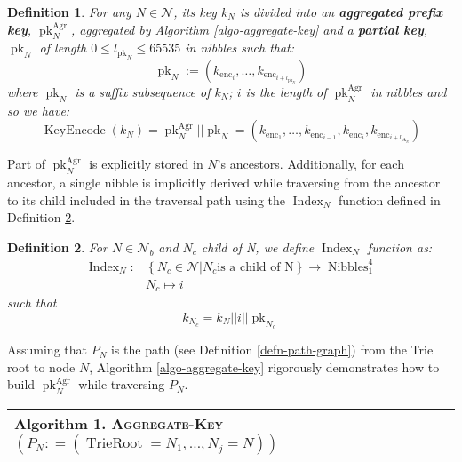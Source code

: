 \documentclass{article}
\newcommand{\assign}{:=}
\newcommand{\tmname}[1]{\textsc{#1}}
\newcommand{\tmop}[1]{\ensuremath{\operatorname{#1}}}
\newcommand{\tmstrong}[1]{\textbf{#1}}
\newcommand{\tmtextbf}[1]{{\bfseries{#1}}}
\newcommand{\tmtextsc}[1]{{\scshape{#1}}}
\newcounter{tmcounter}
\newcommand{\custombinding}[1]{%
  \setcounter{tmcounter}{#1}%
  \addtocounter{tmcounter}{-1}%
  \refstepcounter{tmcounter}}
\newtheorem{definition}{Definition}
\providecommand{\tmname}[1]{\tmtextsc{#1}}
\providecommand{\tmop}[1]{\ensuremath{\mathrm{#1}}}
\providecommand{\tmstrong}[1]{\tmtextbf{#1}}
\providecommand{\tmtextbf}[1]{\tmtextbf{#1}}
\newtheorem{definition}{Definition}
\begin{document}
\begin{definition}
  \label{defn-node-key}For any $N \in \mathcal{N}$, its key $k_N$ is divided
  into an {\tmstrong{aggregated prefix key}},
  {\tmstrong{$\tmop{pk}_N^{\tmop{Agr}}$}}, aggregated by Algorithm
  \ref{algo-aggregate-key} and a {\tmstrong{partial key}},
  {\tmstrong{$\tmop{pk}_N$}} of length $0 \leqslant l_{\tmop{pk}_N} \leqslant
  65535$ in nibbles such that:
  \[ \tmop{pk}_N \assign (k_{\tmop{enc}_i}, \ldots, k_{\tmop{enc}_{i +
     l_{\tmop{pk}_N}}}) \]
  where $\tmop{pk}_N$ is a suffix subsequence of $k_N$; $i$ is the length of
  $\tmop{pk}_N^{\tmop{Agr}}$ in nibbles and so we have:
  \[ \tmop{KeyEncode} (k_N) = \tmop{pk}_N^{\tmop{Agr}} | | \tmop{pk}_N =
     (k_{\tmop{enc}_1}, \ldots, k_{\tmop{enc}_{i - 1}}, k_{\tmop{enc}_i},
     k_{\tmop{enc}_{i + l_{\tmop{pk}_N}}}) \]
\end{definition}

Part of $\tmop{pk}_N^{\tmop{Agr}}$ is explicitly stored in $N$'s ancestors.
Additionally, for each ancestor, a single nibble is implicitly derived while
traversing from the ancestor to its child included in the traversal path using
the $\tmop{Index}_N$ function defined in Definition \ref{defn-index-function}.

\begin{definition}
  \label{defn-index-function}For $N \in \mathcal{N}_b$ and $N_c$ child of N,
  we define {\tmstrong{$\tmop{Index}_N$}} function as:
  \[ \begin{array}{cc}
       \tmop{Index}_N : & \left\{ N_c \in \mathcal{N}|N_c  \text{is a child of
       N} \right\} \rightarrow \tmop{Nibbles}^4_1\\
       & N_c \mapsto i_{}
     \end{array} \]
  such that
  \[ k_{N_c} = k_N | | i | | \tmop{pk}_{N_c} \]
\end{definition}

Assuming that $P_N$ is the path (see Definition \ref{defn-path-graph}) from
the Trie root to node $N$, Algorithm \ref{algo-aggregate-key} rigorously
demonstrates how to build $\tmop{pk}^{\tmop{Agr}}_N$ while traversing $P_N$.

\custombinding{1}{\noindent}\begin{tabular}{l}
  \hline
  \tmtextbf{Algorithm  1. }
  \label{algo-aggregate-key}{\tmname{Aggregate-Key}}$(P_N : = (\tmop{TrieRoot}
  = N_1, \ldots, N_j = N))$\\
  \hline
\end{tabular}
\end{document}
